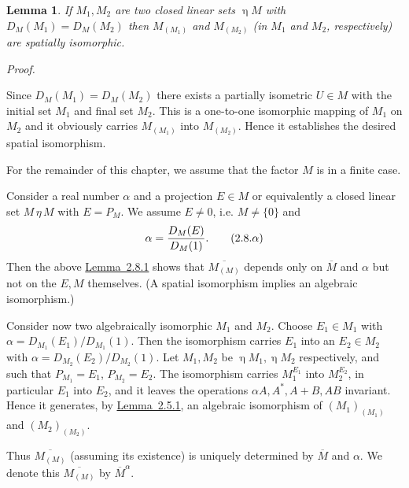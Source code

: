 \documentclass[b5paper,twoside]{article}
\newcommand{\lemref}[2]{\hyperref[#1]{\mbox{Lemma~#2}}}
\theoremstyle{mvnplain}
\newtheorem{lemma}{Lemma}[section]
\renewenvironment{proof}[1][Proof]{%
  \par\addvspace{0.35\baselineskip}%
  \noindent\textit{#1.}\ \normalfont\ignorespaces
}{%
  \par\addvspace{0.35\baselineskip}%
}
\newcommand{\M}{\mathbf M}
\def\M{M}%
\def\mathfrak#1{#1}%
\begin{document}
\begin{lemma}\label{lem:2.8.1}
If $\mathfrak M_1,\mathfrak M_2$ are two closed linear sets $\mathrel{\eta}\M$ with
$D_{\M}(\mathfrak M_1)=D_{\M}(\mathfrak M_2)$ then
$\M_{(\mathfrak M_1)}$ and $\M_{(\mathfrak M_2)}$ (in $\mathfrak M_1$ and
$\mathfrak M_2$, respectively) are spatially isomorphic.
\end{lemma}
\begin{proof}
Since $D_{\M}(\mathfrak M_1)=D_{\M}(\mathfrak M_2)$ there exists a
partially isometric $U\in\M$ with the initial set $\mathfrak M_1$ and final
set $\mathfrak M_2$.  This is a one-to-one isomorphic mapping of
$\mathfrak M_1$ on $\mathfrak M_2$ and it obviously carries
$\M_{(\mathfrak M_1)}$ into $\M_{(\mathfrak M_2)}$.  Hence it establishes
the desired spatial isomorphism.
\end{proof}

For the remainder of this chapter, we assume that the factor $\M$ is in a
finite case.

Consider a real number $\alpha$ and a projection $E\in\M$ or equivalently a
closed linear set $\mathfrak M\,\eta\,\M$ with $E=P_{\mathfrak M}$.  We assume
$E\ne0$, i.e. $\mathfrak M\ne\{0\}$ and
\begin{equation}
  \alpha=\frac{D_{\M}(E)}{D_{\M}(1)}.
  \tag{2.8.\ensuremath{\alpha}}\label{eq:2.8.alpha}
\end{equation}
Then the above \lemref{lem:2.8.1}{2.8.1} shows that
$\overline{\M_{(\mathfrak M)}}$ depends only on $\overline{\M}$ and
$\alpha$ but not on the $E,\mathfrak M$ themselves.  (A spatial isomorphism
implies an algebraic isomorphism.)

Consider now two algebraically isomorphic $\M_1$ and $\M_2$.  Choose
$E_1\in\M_1$ with
$\alpha=D_{\M_1}(E_1)/D_{\M_1}(1)$.  Then the isomorphism carries $E_1$
into an $E_2\in\M_2$ with
$\alpha=D_{\M_2}(E_2)/D_{\M_2}(1)$.  Let
$\mathfrak M_1,\mathfrak M_2$ be $\mathrel{\eta}\M_1,\mathrel{\eta}\M_2$ respectively, and such
that $P_{\mathfrak M_1}=E_1$, $P_{\mathfrak M_2}=E_2$.  The isomorphism
carries $\M_1^{E_1}$ into $\M_2^{E_2}$, in particular $E_1$ into $E_2$, and
it leaves the operations $\alpha A,A^{*},A+B,AB$ invariant.  Hence it
generates, by \lemref{lem:2.5.1}{2.5.1}, an algebraic isomorphism of
$(\M_1)_{(\mathfrak M_1)}$ and $(\M_2)_{(\mathfrak M_2)}$.

Thus $\overline{\M_{(\mathfrak M)}}$ (assuming its existence) is uniquely
determined by $\overline{\M}$ and $\alpha$.  We denote this
$\overline{\M_{(\mathfrak M)}}$ by $\overline{\M}^{\alpha}$.
\end{document}
